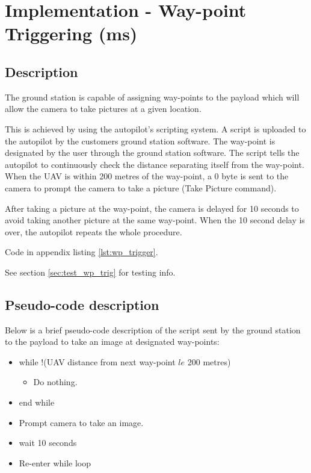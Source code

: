 \section{Implementation - Way-point Triggering (ms)}
\label{sec:waypoint_triggering}

\subsection{Description}

The ground station is capable of assigning way-points to
the payload which will allow the camera to take pictures 
at a given location.

This is achieved by using the autopilot's scripting system.
A script is uploaded to the autopilot by the customers ground station
software. The way-point is designated by the user
through the ground station software. The script 
tells the autopilot to continuously check the
distance separating itself from the way-point.
When the UAV is within 200 metres of the
way-point, a 0 byte is sent to the camera to prompt
the camera to take a picture (Take Picture command).

After taking a picture at the way-point, the camera
is delayed for 10 seconds to avoid taking another picture
at the same way-point. When the 10 second delay is over,
the autopilot repeats the whole procedure.

Code in appendix listing \ref{lst:wp_trigger}.

See section \ref{sec:test_wp_trig} for testing info.

\subsection{Pseudo-code description}

Below is a brief pseudo-code description of the script
sent by the ground station to the payload to take an
image at designated way-points:

\begin{itemize}
	\item while !(UAV distance from next way-point $le$ 200 metres)
		\begin{itemize}
			\item Do nothing.
		\end{itemize}
	\item end while
	\item Prompt camera to take an image.
	\item wait 10 seconds
	\item Re-enter while loop
\end{itemize}

